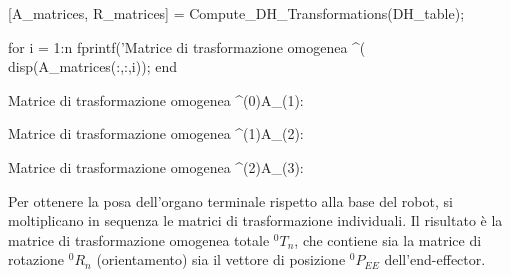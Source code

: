 \documentclass[11pt, a4paper]{article}
\begin{document}
\begin{matlabcode}
[A_matrices, R_matrices] = Compute_DH_Transformations(DH_table);

for i = 1:n
    fprintf('Matrice di trasformazione omogenea ^(%
    disp(A_matrices(:,:,i));
end
\end{matlabcode}
\begin{matlaboutput}
Matrice di trasformazione omogenea ^(0)A_(1):
\end{matlaboutput}
\begin{matlaboutput}
Matrice di trasformazione omogenea ^(1)A_(2):
\end{matlaboutput}
\begin{matlaboutput}
Matrice di trasformazione omogenea ^(2)A_(3):
\end{matlaboutput}

\newpage
\begin{par}
\begin{flushleft}
Per ottenere la posa dell'organo terminale rispetto alla base del robot, si moltiplicano in sequenza le matrici di trasformazione individuali. Il risultato è la matrice di trasformazione omogenea totale $^0 T_n$, che contiene sia la matrice di rotazione $^0 R_n$ (orientamento) sia il vettore di posizione $^0 P_{EE}$ dell'end-effector.
\end{flushleft}
\end{par}
\end{document}
